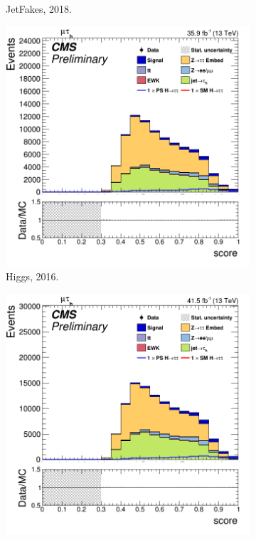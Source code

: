 \begin{figure}[!ht]
\begin{subfigure}[b]{0.33\linewidth}
    \caption{JetFakes, 2018.} 
    \vspace{0.5cm}
  \end{subfigure} 
  \begin{subfigure}[b]{0.33\linewidth}
    \centering
    \includegraphics[width=\linewidth]{Chapitre7/Images/CtrlPlots/2016/BDTscoreHiggs.png} 
    \caption{Higgs, 2016.} 
    \vspace{0.5ex}
  \end{subfigure}%
  \begin{subfigure}[b]{0.33\linewidth}
    \centering
    \includegraphics[width=\linewidth]{Chapitre7/Images/CtrlPlots/2017/BDTscoreHiggs.png} 

\end{subfigure}
\end{figure}
